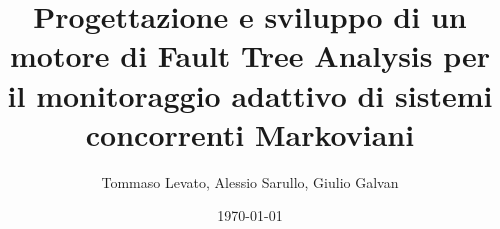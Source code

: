\documentclass[xcolor=dvipsnames,10pt]{beamer}
\title[Monitoraggio adattivo di sistemi concorrenti Markoviani]{Progettazione e sviluppo di un motore di Fault Tree Analysis per il monitoraggio adattivo di sistemi concorrenti Markoviani}
\author{Tommaso Levato, Alessio Sarullo, Giulio Galvan}
\date{\today}
\begin{document}
\frame{\titlepage}




\section*{}

\end{document}
